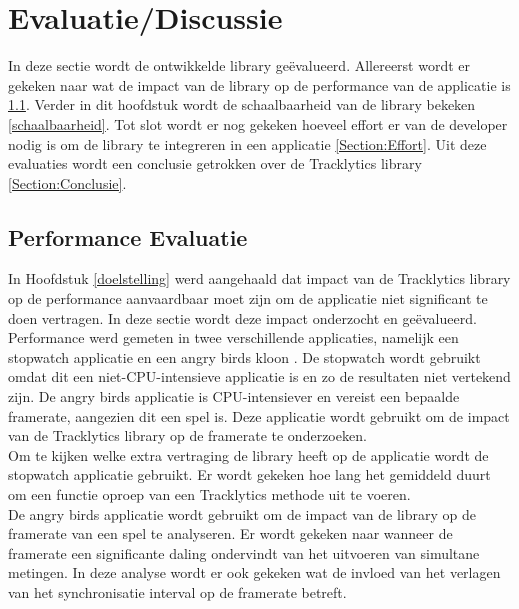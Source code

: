 \chapter{Evaluatie/Discussie} \label{evaluatie}
In deze sectie wordt de ontwikkelde library ge\"evalueerd. Allereerst wordt er gekeken naar wat de impact van de library op de performance van de applicatie is \ref{performance}. Verder in dit hoofdstuk wordt de schaalbaarheid van de library bekeken \ref{schaalbaarheid}. Tot slot wordt er nog gekeken hoeveel effort er van de developer nodig is om de library te integreren in een applicatie \ref{Section:Effort}. Uit deze evaluaties wordt een conclusie getrokken over de Tracklytics library \ref{Section:Conclusie}.


\section{Performance Evaluatie} \label{performance}
In Hoofdstuk \ref{doelstelling} werd aangehaald dat impact van de Tracklytics library op de performance aanvaardbaar moet zijn om de applicatie niet significant te doen vertragen. In deze sectie wordt deze impact onderzocht en ge\"evalueerd. \\

Performance werd gemeten in twee verschillende applicaties, namelijk een stopwatch applicatie en een angry birds kloon \cite{AngryBirds}. De stopwatch wordt gebruikt omdat dit een niet-CPU-intensieve applicatie is en zo de resultaten niet vertekend zijn. De angry birds applicatie is CPU-intensiever en vereist een bepaalde framerate, aangezien dit een spel is. Deze applicatie wordt gebruikt  om de impact van de Tracklytics library op de framerate te onderzoeken. \\

Om te kijken welke extra vertraging de library heeft op de applicatie wordt de stopwatch applicatie gebruikt. Er wordt gekeken hoe lang het gemiddeld duurt om een functie oproep van een Tracklytics methode uit te voeren.\\

De angry birds applicatie wordt gebruikt om de impact van de library op de framerate van een spel te analyseren. Er wordt gekeken naar wanneer de framerate een significante daling ondervindt van het uitvoeren van simultane metingen. In deze analyse wordt er ook gekeken wat de invloed van het verlagen van het synchronisatie interval op de framerate betreft.\\

